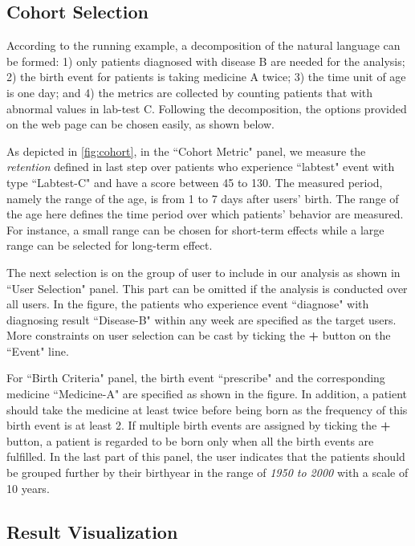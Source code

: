 \subsection{Cohort Selection}

According to the running example, a decomposition of the natural language can be formed: 1) only patients diagnosed with disease B are needed for the analysis; 2) the birth event for patients is taking medicine A twice; 3) the time unit of age is one day; and 4) the metrics are collected by counting patients that with abnormal values in lab-test C. 
Following the decomposition, the options provided on the web page can be chosen easily, as shown below.

As depicted in \ref{fig:cohort}, in the ``Cohort Metric" panel, we measure the \emph{retention} defined in last step over patients who experience ``labtest" event with type ``Labtest-C" and have a score between 45 to 130. 
The measured period, namely the range of the age, is from 1 to 7 days after users' birth.
The range of the age here defines the time period over which patients' behavior are measured. For instance, a small range can be chosen for short-term effects while a large range can be selected for long-term effect.

The next selection is on the group of user to include in our analysis as shown in ``User Selection" panel. This part can be omitted if the analysis is conducted over all users. 
In the figure, the patients who experience event ``diagnose" with diagnosing result ``Disease-B" within any week are specified as the target users.
More constraints on user selection can be cast by ticking the \textbf{+} button on the ``Event" line.

For ``Birth Criteria" panel, the birth event ``prescribe" and the corresponding medicine ``Medicine-A" are specified as shown in the figure.
In addition, a patient should take the medicine at least twice before being 
born as the frequency of this birth event is at least 2.
If multiple birth events are assigned by ticking the \textbf{+} button, a 
patient is regarded to be born only when all the birth events are fulfilled. 
In the last part of this panel, the user indicates that the patients should be grouped further by their birthyear in the range of \emph{1950 to 2000} with a scale of 10 years.

\subsection{Result Visualization}

